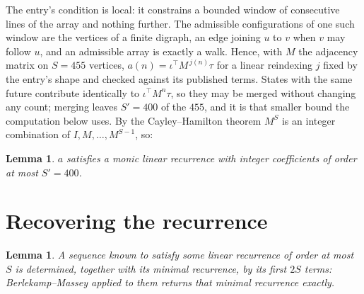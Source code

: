 \documentclass[11pt,a4paper]{article}
\theoremstyle{plain}
\newtheorem{lemma}[theorem]{Lemma}
\theoremstyle{definition}
\begin{document}
The entry's condition is local: it constrains a bounded window of consecutive lines of the
array and nothing further. The admissible configurations of one such window are the vertices
of a finite digraph, an edge joining $u$ to $v$ when $v$ may follow $u$, and an admissible
array is exactly a walk. Hence, with $M$ the adjacency matrix on $S=455$ vertices,
$a(n)=\iota^{\!\top}M^{\,j(n)}\tau$ for a linear reindexing $j$ fixed by the entry's shape
and checked against its published terms. States with the same future contribute identically to $\iota^{\!\top}M^n\tau$, so they may be merged without changing any count; merging leaves $S'=400$ of the $455$, and it is that smaller bound the computation below uses. By the Cayley--Hamilton theorem $M^{S}$ is an
integer combination of $I,M,\dots,M^{S-1}$, so:

\begin{lemma}\label{lem:cf}
$a$ satisfies a monic linear recurrence with integer coefficients of order at most
$S'=400$.
\end{lemma}

\section{Recovering the recurrence}

\begin{lemma}\label{lem:bm}
A sequence known to satisfy some linear recurrence of order at most $S$ is determined, together
with its minimal recurrence, by its first $2S$ terms: Berlekamp--Massey applied to them returns
that minimal recurrence exactly.
\end{lemma}
\end{document}
